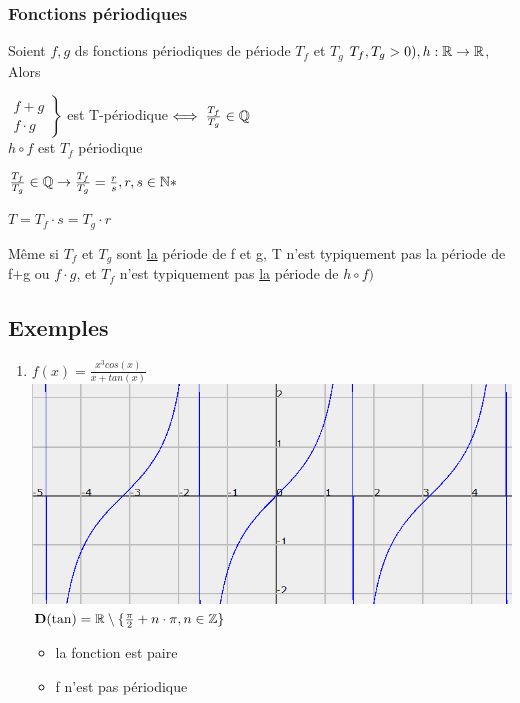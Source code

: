 \documentclass[12pt,a4paper]{article}
\begin{document}
{\subsubsection{Fonctions périodiques}
Soient $f,g$ ds fonctions périodiques de période $T_f$ et $T_g$ $T_f,T_g > 0), h : \mathbb{R} \to \mathbb{R}$, Alors 
\begin{boite}
	$\left.
	\begin{array}{l}
	f+g\\
	f\cdot g
	\end{array}
	\right\}$ est T-périodique$ \iff \frac{T_f}{T_g} \in \mathbb{Q}$\\
	$h\circ f$ est $T_f$ périodique
\end{boite} 
 $\frac{T_f}{T_g} \in \mathbb{Q} \to \frac{T_f}{T_g} = \frac{r}{s}, r,s \in \mathbb{N}*$\\
\begin{boite}[0.3]
	$T = T_f \cdot s = T_g \cdot r$
\end{boite}
 Même si $T_f$ et $T_g$ sont \underline{la} période de f et g, T n'est typiquement pas la période de f+g ou $f\cdot g$, et $T_f$ n'est typiquement pas \underline{la} période de $h\circ f)$
\subsection{Exemples}
\begin{enumerate}
\item $f(x) = \frac{x^3cos(x)}{x+tan(x)}$ \\
	\includegraphics[scale=0.3]{illustrations_Analyse/tanx}\\
	$\mathbf{D}(\tan) = \mathbb{R}\setminus \{\frac{\pi}{2} + n\cdot \pi, n \in \mathbb{Z}\}$
	\begin{itemize}
		\item la fonction est paire
		\item f n'est pas périodique
	\end{itemize}
	

\end{enumerate}}
\end{document}
